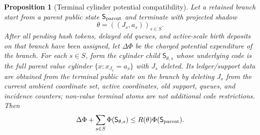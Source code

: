 \documentclass[11pt]{article}
\newtheorem{proposition}[theorem]{Proposition}
\begin{document}
\begin{proposition}[Terminal cylinder potential compatibility]
\label{prop:terminal-cylinder-potential}
Let a retained branch start from a parent public state $\mathsf S_{\rm parent}$
and terminate with projected shadow
\[
  \theta=((J_s,a_s))_{s\in S}.
\]
After all pending hash tokens, delayed old queues, and active-scale birth
deposits on that branch have been assigned, let $\Delta\Phi$ be the charged
potential expenditure of the branch.  For each $s\in S$, form the cylinder
child $\mathsf S_{\theta,s}$ whose underlying code is the full parent value
cylinder $\{x:x_{J_s}=a_s\}$ with $J_s$ deleted.  Its ledger/support data are
obtained from the terminal public state on the branch by deleting $J_s$ from the
current ambient coordinate set, active coordinates, old support, queues, and
incidence counters; non-value terminal atoms are not additional code
restrictions.  Then
\[
  \Delta\Phi+\sum_{s\in S}\Phi(\mathsf S_{\theta,s})
  \le
  R(\theta)\Phi(\mathsf S_{\rm parent}).
\]
\end{proposition}
\end{document}
